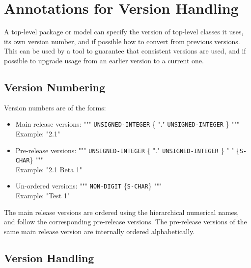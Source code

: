 \section{Annotations for Version Handling}\label{annotations-for-version-handling}

A top-level package or model can specify the version of top-level
classes it uses, its own version number, and if possible how to convert
from previous versions. This can be used by a tool to guarantee that
consistent versions are used, and if possible to upgrade usage from an
earlier version to a current one.

\subsection{Version Numbering}\label{version-numbering}

Version numbers are of the forms:
\begin{itemize}
\item
  Main release versions: """ \lstinline!UNSIGNED-INTEGER! \{ "." \lstinline!UNSIGNED-INTEGER! \} """\\
  Example: "2.1"
\item
  Pre-release versions: """ \lstinline!UNSIGNED-INTEGER! \{ "." \lstinline!UNSIGNED-INTEGER! \} " " \{\lstinline!S-CHAR!\} """\\
  Example: "2.1 Beta 1"
\item
  Un-ordered versions: """ \lstinline!NON-DIGIT! \{\lstinline!S-CHAR!\} """\\
  Example: "Test 1"
\end{itemize}

The main release versions are ordered using the hierarchical numerical
names, and follow the corresponding pre-release versions. The
pre-release versions of the same main release version are internally
ordered alphabetically.

\subsection{Version Handling}\label{version-handling}


